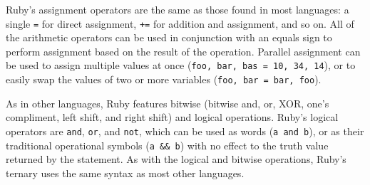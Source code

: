 \documentclass[12pt]{article}
\begin{document}
Ruby's assignment operators are the same as those found in most languages: a single \verb|=| for direct assignment, \verb|+=| for addition and assignment, and so on. All of the arithmetic operators can be used in conjunction with an equals sign to perform assignment based on the result of the operation. Parallel assignment can be used to assign multiple values at once (\verb|foo, bar, bas = 10, 34, 14|), or to easily swap the values of two or more variables (\verb|foo, bar = bar, foo|)\cite{opstut}.

As in other languages, Ruby features bitwise (bitwise and, or, XOR, one's compliment, left shift, and right shift) and logical operations. Ruby's logical operators are \verb|and|, \verb|or|, and \verb|not|, which can be used as words (\verb|a and b|), or as their traditional operational symbols (\verb|a && b|) with no effect to the truth value returned by the statement. As with the logical and bitwise operations, Ruby's ternary uses the same syntax as most other languages\cite{opstut}.
\end{document}
